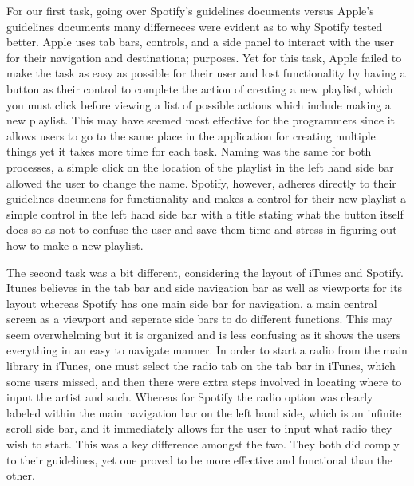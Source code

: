 \documentclass[a4paper]{article}
\begin{document}
For our first task, going over Spotify's guidelines documents versus Apple's guidelines documents many differneces were evident as to why Spotify tested better. Apple uses tab bars, controls, and a side panel to interact with the user for their navigation and destinationa; purposes. Yet for this task, Apple failed to make the task as easy as possible for their user and lost functionality by having a button as their control to complete the action of creating a new playlist, which you must click before viewing a list of possible actions which include making a new playlist. This may have seemed most effective for the programmers since it allows users to go to the same place in the application for creating multiple things yet it takes more time for each task. Naming was the same for both processes, a simple click on the location of the playlist in the left hand side bar allowed the user to change the name. Spotify, however, adheres  directly to their guidelines documens for functionality and makes a control for their new playlist a simple control in the left hand side bar with a title stating what the button itself does so as not to confuse the user and save them time and stress in figuring out how to make a new playlist. 

The second task was a bit different, considering the layout of iTunes and Spotify. Itunes believes in the tab bar and side navigation bar as well as viewports for its layout whereas Spotify has one main side bar for navigation, a main central screen as a viewport and seperate side bars to do different functions. This may seem overwhelming but it is organized and is less confusing as it shows the users everything in an easy to navigate manner. In order to start a radio from the main library in iTunes, one must select the radio tab on the tab bar in iTunes, which some users missed, and then there were extra steps involved in locating where to input the artist and such. Whereas for Spotify the radio option was clearly labeled within the main navigation bar on the left hand side, which is an infinite scroll side bar, and it immediately allows for the user to input what radio they wish to start. This was a key difference amongst the two. They both did comply to their guidelines, yet one proved to be more effective and functional than the other.
\end{document}
